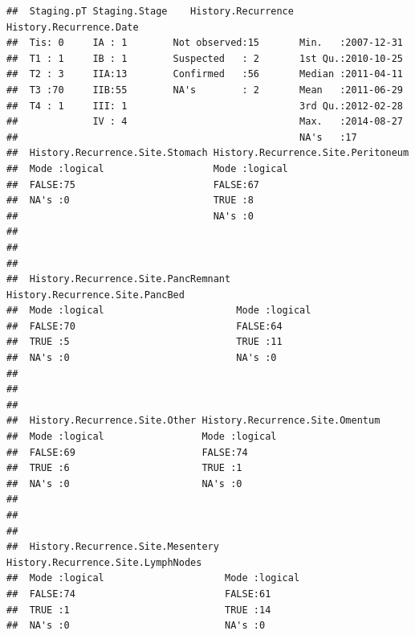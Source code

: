 \documentclass{article}\usepackage[]{graphicx}\usepackage[]{color}
\makeatletter
\newenvironment{kframe}{%
 \def\at@end@of@kframe{}%
 \ifinner\ifhmode%
  \def\at@end@of@kframe{\end{minipage}}%
  \begin{minipage}{\columnwidth}%
 \fi\fi%
 \def\FrameCommand##1{\hskip\@totalleftmargin \hskip-\fboxsep
 \colorbox{shadecolor}{##1}\hskip-\fboxsep
     \hskip-\linewidth \hskip-\@totalleftmargin \hskip\columnwidth}%
 \MakeFramed {\advance\hsize-\width
   \@totalleftmargin\z@ \linewidth\hsize
   \@setminipage}}%
 {\par\unskip\endMakeFramed%
 \at@end@of@kframe}
\newenvironment{knitrout}{}{} %
\makeatother
\begin{document}
\begin{knitrout}
\begin{kframe}
\begin{verbatim}
##  Staging.pT Staging.Stage    History.Recurrence History.Recurrence.Date
##  Tis: 0     IA : 1        Not observed:15       Min.   :2007-12-31     
##  T1 : 1     IB : 1        Suspected   : 2       1st Qu.:2010-10-25     
##  T2 : 3     IIA:13        Confirmed   :56       Median :2011-04-11     
##  T3 :70     IIB:55        NA's        : 2       Mean   :2011-06-29     
##  T4 : 1     III: 1                              3rd Qu.:2012-02-28     
##             IV : 4                              Max.   :2014-08-27     
##                                                 NA's   :17             
##  History.Recurrence.Site.Stomach History.Recurrence.Site.Peritoneum
##  Mode :logical                   Mode :logical                     
##  FALSE:75                        FALSE:67                          
##  NA's :0                         TRUE :8                           
##                                  NA's :0                           
##                                                                    
##                                                                    
##                                                                    
##  History.Recurrence.Site.PancRemnant History.Recurrence.Site.PancBed
##  Mode :logical                       Mode :logical                  
##  FALSE:70                            FALSE:64                       
##  TRUE :5                             TRUE :11                       
##  NA's :0                             NA's :0                        
##                                                                     
##                                                                     
##                                                                     
##  History.Recurrence.Site.Other History.Recurrence.Site.Omentum
##  Mode :logical                 Mode :logical                  
##  FALSE:69                      FALSE:74                       
##  TRUE :6                       TRUE :1                        
##  NA's :0                       NA's :0                        
##                                                               
##                                                               
##                                                               
##  History.Recurrence.Site.Mesentery History.Recurrence.Site.LymphNodes
##  Mode :logical                     Mode :logical                     
##  FALSE:74                          FALSE:61                          
##  TRUE :1                           TRUE :14                          
##  NA's :0                           NA's :0                           

\end{verbatim}
\end{kframe}
\end{knitrout}
\end{document}
